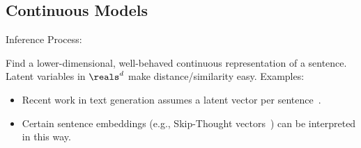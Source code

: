 





\subsection{Continuous Models}

\begin{frame}
Inference Process:
\begin{center}
\end{center}

\pause 

Find a lower-dimensional, well-behaved  continuous representation of a sentence. Latent variables in $\reals^d$ make distance/similarity easy.  Examples: 
\begin{itemize}
    \item Recent work in text generation assumes a latent vector per sentence~\citep{Bowman2016,Yang2017,hu2017toward}.
    \item Certain sentence embeddings (e.g., Skip-Thought vectors~\citep{kiros2015skip}) can be interpreted in this way.
\end{itemize}
\end{frame}

